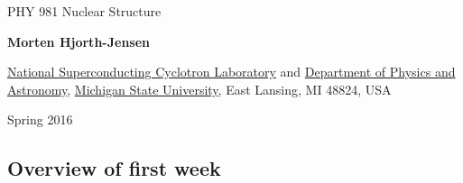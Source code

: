 \documentclass[%
oneside,                 %
final,                   %
10pt]{article}
\begin{document}






\thispagestyle{empty}

\begin{center}
{\LARGE\bf
\begin{spacing}{1.25}
PHY 981 Nuclear Structure
\end{spacing}
}
\end{center}


\begin{center}
{\bf Morten Hjorth-Jensen}
\end{center}

    \begin{center}
\centerline{{\small \href{{http://www.nscl.msu.edu/}}{National Superconducting Cyclotron Laboratory} and \href{{https://www.pa.msu.edu/}}{Department of Physics and Astronomy}, \href{{http://www.msu.edu/}}{Michigan State University}, East Lansing, MI 48824, USA}}
\end{center}
    

\begin{center}
Spring 2016 
\end{center}

\vspace{1cm}


\subsection{Overview of first week}

\paragraph{}
\end{document}
